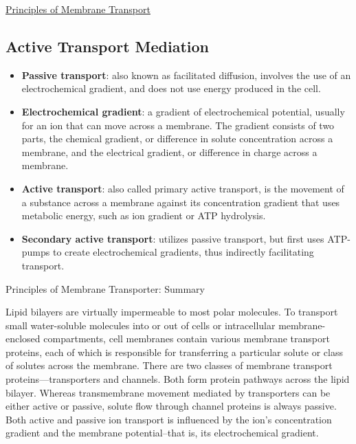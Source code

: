 \documentclass[12pt,letterpaper]{article}
\begin{document}
\begin{secbox}{\hyperlink{11}{Principles of Membrane Transport}}
{    \hypertarget{11.1.2}{\subsection*{Active Transport Mediation}}
    \begin{itemize}
        \item \textbf{Passive transport}: also known as facilitated diffusion, involves the use of an electrochemical gradient, and does not use energy produced in the cell.
        \item \textbf{Electrochemical gradient}: a gradient of electrochemical potential, usually for an ion that can move across a membrane. The gradient consists of two parts, the chemical gradient, or difference in solute concentration across a membrane, and the electrical gradient, or difference in charge across a membrane.
        \item \textbf{Active transport}: also called primary active transport, is the movement of a substance across a membrane against its concentration gradient that uses metabolic energy, such as ion gradient or ATP hydrolysis.
        \item \textbf{Secondary active transport}: utilizes passive transport, but first uses ATP-pumps to create electrochemical gradients, thus indirectly facilitating transport. 
    \end{itemize} 
    \vspace{6pt}
    \hypertarget{11.1.r}{}
    \begin{probbox}{Principles of Membrane Transporter: Summary}\end{probbox}
    \vspace{18pt}
        Lipid bilayers are virtually impermeable to most polar molecules. To transport small water-soluble molecules into or out of cells or intracellular membrane-enclosed compartments, cell membranes contain various membrane transport proteins, each of which is responsible for transferring a particular solute or class of solutes across the membrane. There are two classes of membrane transport proteins—transporters and channels. Both form protein pathways across the lipid bilayer. Whereas transmembrane movement mediated by transporters can be either active or passive, solute flow through channel proteins is always passive. Both active and passive ion transport is influenced by the ion’s concentration gradient and the membrane potential--that is, its electrochemical gradient.
}\end{secbox}
\end{document}
